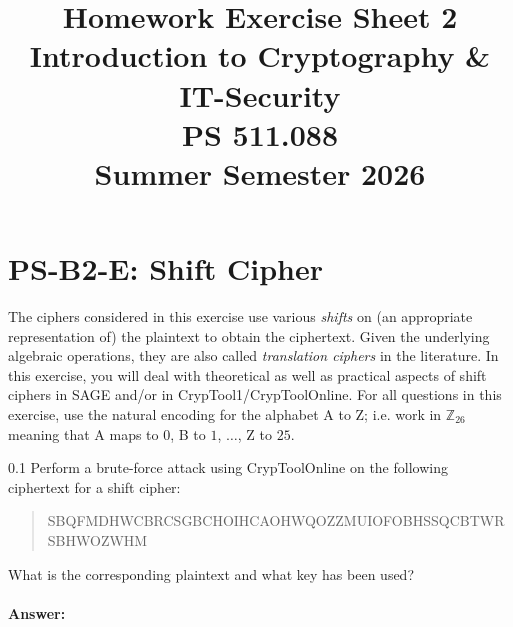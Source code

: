 \documentclass[]{scrartcl}
\title{Homework Exercise Sheet 2\\Introduction to Cryptography \& IT-Security\\PS 511.088\\Summer Semester 2026}
\author{\groupname}
\newcommand{\ZZ}{\mathbb{Z}}
\newcounter{exercise}
\newcounter{qid}[section]
\newcommand{\exerciseprefix}{prefix}
\newcommand{\questiontitle}{Questions}
\newcommand{\blockid}{B2}
\newcommand{\exname}{}
\newcommand{\ctone}{CrypTool1}
\newcommand{\ctonline}{CrypToolOnline}
\begin{document}
\maketitle
{}
\date{}
\newpage

\renewcommand{\exname}{Alg. Crypt.}
\section*{PS-\blockid{}-E\theexercise: Shift Cipher}
The ciphers considered in this exercise use various \emph{shifts} on (an appropriate representation of) the plaintext to obtain the ciphertext. Given the underlying algebraic operations, they are also called \emph{translation ciphers} in the literature. In this exercise, you will deal with theoretical as well as practical aspects of shift ciphers in SAGE and/or in \ctone{}/\ctonline{}. For all questions in this exercise, use the natural encoding for the alphabet A to Z; i.e. work in $\ZZ_{26}$ meaning that A maps to $0$, B to $1$, $\ldots$, Z to $25$. 

\newcommand{\cipherone}{SBQFMDHWCBRCSGBCHOIHCAOHWQOZZMUIOFOBHSSQCBTWRSBHWOZWHM}
\renewcommand{\exerciseprefix}{PS-\blockid{}-E\theexercise: \exname{}-Q\theqid}
\renewcommand{\questiontitle}{\exerciseprefix{}: Brute-force attack on shift cipher (I/II)}
\begin{exercisebox}{0.1}
Perform a brute-force attack using \ctonline{} on the following ciphertext for a shift cipher:
\begin{quote}
    {\tiny \cipherone{}}
\end{quote}
What is the corresponding plaintext and what key has been used?
\end{exercisebox}

\paragraph{Answer:} 
\end{document}
